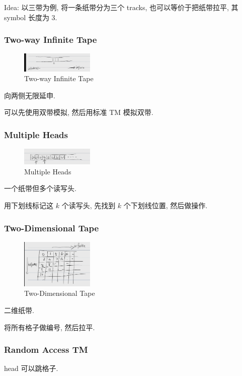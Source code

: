 Idea: 以三带为例, 将一条纸带分为三个 tracks, 也可以等价于把纸带拉平, 其 symbol 长度为 3. 

\subsubsection{Two-way Infinite Tape}
\begin{figure}[!htb]
    \centering
    \includegraphics[width=0.309\textwidth]{pic/TC5/twi.png}
    \caption{Two-way Infinite Tape}
\end{figure}

向两侧无限延申. 

可以先使用双带模拟, 然后用标准 TM 模拟双带.

\subsubsection{Multiple Heads}
\begin{figure}[!htb]
    \centering
    \includegraphics[width=0.309\textwidth]{pic/TC5/mh.png}
    \caption{Multiple Heads}
\end{figure}

一个纸带但多个读写头. 

用下划线标记这 $k$ 个读写头, 先找到 $k$ 个下划线位置, 然后做操作. 

\subsubsection{Two-Dimensional Tape}
\begin{figure}[!htb]
    \centering
    \includegraphics[width=0.309\textwidth]{pic/TC5/tdt.png}
    \caption{Two-Dimensional Tape}
\end{figure}

二维纸带. 

将所有格子做编号, 然后拉平. 

\subsubsection{Random Access TM}
head 可以跳格子. 

